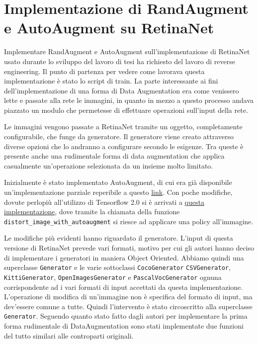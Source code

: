 \chapter{Implementazione di RandAugment e AutoAugment su RetinaNet}


Implementare RandAugment e AutoAugment sull'implementazione di RetinaNet usato durante lo sviluppo del lavoro di tesi ha richiesto del lavoro di reverse engineering. Il punto di partenza per vedere come lavorava questa implementazione è stato lo script di train. La parte interessante ai fini dell'implementazione di una forma di Data Augmentation era come venissero lette e passate alla rete le immagini, in quanto in mezzo a questo processo andava piazzato un modulo che permetesse di effettuare operazioni sull'input della rete. 

Le immagini vengono passate a RetinaNet tramite un oggetto, completamente configurabile, che funge da generatore. Il generatore viene creato attraverso diverse opzioni che lo andranno a configurare secondo le esigenze. Tra queste è presente anche una rudimentale forma di data augmentation che applica casualmente un'operazione selezionata da un insieme molto limitato. 

Inizialmente è stato implementato AutoAugment, di cui era già disponibile un'implementazione parziale reperibile a questo \href{https://github.com/tensorflow/tpu/blob/master/models/official/detection/utils/autoaugment_utils.py}{link}. Con poche modifiche, dovute perlopiù all'utilizzo di Tensorflow 2.0 si è arrivati a \href{https://github.com/iskorini/keras-retinanet/blob/master/keras_retinanet/utils/autoaugment_utils_tf2.py}{questa implementazione}, dove tramite la chiamata della funzione \texttt{distort\_image\_with\_autoaugment} si riesce ad applicare una policy all'immagine. 

Le modifiche più evidenti hanno riguardato il generatore. L'input di questa versione di RetinaNet prevede vari formati, motivo per cui gli autori hanno deciso di implementare i generatori in maniera Object Oriented. Abbiamo quindi una superclasse \texttt{Generator} e le varie sottoclassi \texttt{CocoGenerator} \texttt{CSVGenerator}, \texttt{KittiGenerator}, \texttt{OpenImagesGenerator} e \texttt{PascalVocGenerator} ognuna corrispondente ad i vari formati di input accettati da questa implementazione. L'operazione di modifica di un'immagine non è specifica del formato di input, ma dev'essere comune a tutte. Quindi l'intervento è stato circoscritto alla superclasse \texttt{Generator}. Seguendo quanto stato fatto dagli autori per implementare la prima forma rudimentale di DataAugmentation sono stati implementate due funzioni del tutto similari alle controparti originali. 


